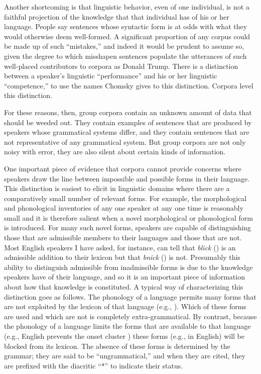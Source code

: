 Another shortcoming is that linguistic behavior, even of one individual, is not a faithful projection of the knowledge that that individual has of his or her language. People say sentences whose syntactic form is at odds with what they would otherwise deem well-formed. A significant proportion of any corpus could be made up of such ``mistakes,'' and indeed it would be prudent to assume so, given the degree to which misshapen sentences populate the utterances of such well-placed contributors to corpora as Donald Trump. There is a distinction between a speaker's linguistic ``performance'' and his or her linguistic ``competence,'' to use the names Chomsky gives to this distinction. Corpora level this distinction.

For these reasons, then, group corpora contain an unknown amount of data that should be weeded out. They contain examples of sentences that are produced by speakers whose grammatical systems differ, and they contain sentences that are not representative of any grammatical system. But group corpora are not only noisy with error, they are also silent about certain kinds of information.

One important piece of evidence that corpora cannot provide concerns where speakers draw the line between impossible and possible forms in their language. This distinction is easiest to elicit in linguistic domains where there are a comparatively small number of relevant forms. For example, the morphological and phonological inventories of any one speaker at any one time is reasonably small and it is therefore salient when a novel morphological or phonological form is introduced. For many such novel forms, speakers are capable of distinguishing those that are admissible members to their languages and those that are not. Most English speakers I have asked, for instance, can tell that \emph{blick} (\textipa{[blIk]}) is an admissible addition to their lexicon but that \emph{bnick} (\textipa{[bnIk]}) is not. Presumably this ability to distinguish admissible from inadmissible forms is due to the knowledge speakers have of their language, and so it is an important piece of information about how that knowledge is constituted. A typical way of characterizing this distinction goes as follows. The phonology of a language permits many forms that are not exploited by the lexicon of that language (e.g., \textipa{[blIk]}). Which of these forms are used and which are not is completely extra-grammatical. By contrast, because the phonology of a language limits the forms that are available to that language (e.g., English prevents the onset cluster \textipa{[bn]}) these forms (e.g., \textipa{[bnIk]} in English) will be blocked from its lexicon. The absence of these forms is determined by the grammar; they are said to be ``ungrammatical,'' and when they are cited, they are prefixed with the diacritic ``*'' to indicate their status.

